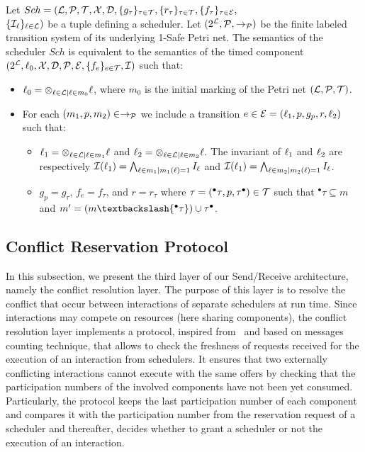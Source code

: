 \begin{property}\label{pr:sch_sr_sem}
  Let $Sch=(\mathcal{L}, \mathcal{P},\mathcal{T},\mathcal{X}, \mathcal{D},\{g_{\tau}\}_{\tau\in\mathcal{T}},\{r_{\tau}\}_{\tau\in\mathcal{T}},
    \{f_{\tau}\}_{\tau\in\mathcal{E}},$\\$\{\mathcal{I}_{\ell}\}_{\ell\in\mathcal{L}})$ be a tuple defining 
  a scheduler. Let $(2^{\mathcal{L}},\mathcal{P},\to_{\mathcal{P}})$ be the finite labeled transition
  system of its underlying 1-Safe Petri net. The semantics of the scheduler $Sch$ 
  is equivalent to the semantics of the timed component 
  $(2^{\mathcal{L}},\ell_0,\mathcal{X},\mathcal{D},\mathcal{P},\mathcal{E},\{f_{e}\}_{e\in\mathcal{T}},\mathcal{I})$ such that:
  \begin{itemize}
    \item $\ell_0=\otimes_{\ell\in\mathcal{L} |\ell\in m_0}\ell$, where $m_0$ is the initial marking 
      of the Petri net $(\mathcal{L}, \mathcal{P},\mathcal{T})$.
    \item For each $(m_1,p,m_2)\in\to_{\mathcal{P}}$ we include a transition $e\in\mathcal{E}=
      (\ell_1,p,g_p,r,\ell_2)$ such that:
      \begin{itemize}
        \item $\ell_1=\otimes_{\ell\in \mathcal{L}|\ell\in m_1}\ell$ and
              $\ell_2=\otimes_{\ell\in \mathcal{L}|\ell\in m_2}\ell$. The invariant of $\ell_1$ and 
              $\ell_2$ are respectively 
              $\mathcal{I}(\ell_1)=\bigwedge_{\ell\in m_1|m_1(\ell)=1}I_{\ell}$ and
              $\mathcal{I}(\ell_1)=\bigwedge_{\ell\in m_2|m_2(\ell)=1}I_{\ell}$.
            \item $g_p=g_{\tau}$, $f_e=f_{\tau}$, and $r=r_{\tau}$ where 
              $\tau=({^\bullet\tau},p,{\tau^\bullet })\in\mathcal{T}$ such that
            ${^\bullet\tau}\subseteq m$ and $m'=(m\textbackslash{^\bullet\tau})
  \cup{\tau^\bullet }$.
      \end{itemize}
  \end{itemize}
\end{property}



\subsection{Conflict Reservation Protocol}
In this subsection, we present the third layer of our Send/Receive architecture, namely
the conflict resolution layer. The purpose of this layer is to resolve the conflict
that occur between interactions of separate schedulers at run time. 
Since interactions may compete on resources (here sharing components), the conflict resolution
layer implements a protocol, inspired from~\cite{msg_cnt} and based on messages counting 
technique,
that allows to check the freshness of requests received for the execution of an interaction
from schedulers. It ensures that two externally conflicting interactions
cannot execute with the same offers by checking that the participation numbers of the involved 
components have not been yet consumed. Particularly, the protocol keeps the last participation
number of each component and compares it with the participation number from the reservation 
request of a scheduler and thereafter, decides whether to grant a scheduler or not the execution
of an interaction.

